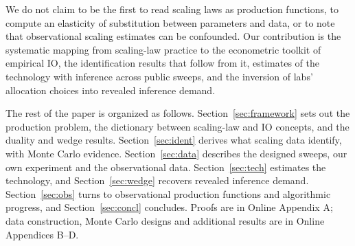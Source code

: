 We do not claim to be the first to read scaling laws as production functions, to compute an elasticity of
substitution between parameters and data, or to note that observational scaling estimates can be confounded. Our
contribution is the systematic mapping from scaling-law practice to the econometric toolkit of empirical IO, the
identification results that follow from it, estimates of the technology with inference across public sweeps, and the
inversion of labs' allocation choices into revealed inference demand.

The rest of the paper is organized as follows. Section~\ref{sec:framework} sets out the production problem, the
dictionary between scaling-law and IO concepts, and the duality and wedge results. Section~\ref{sec:ident} derives
what scaling data identify, with Monte Carlo evidence. Section~\ref{sec:data} describes the designed sweeps, our own
experiment and the observational data. Section~\ref{sec:tech} estimates the technology, and Section~\ref{sec:wedge}
recovers revealed inference demand. Section~\ref{sec:obs} turns to observational production functions and
algorithmic progress, and Section~\ref{sec:concl} concludes. Proofs are in Online Appendix A; data construction,
Monte Carlo designs and additional results are in Online Appendices B--D.
